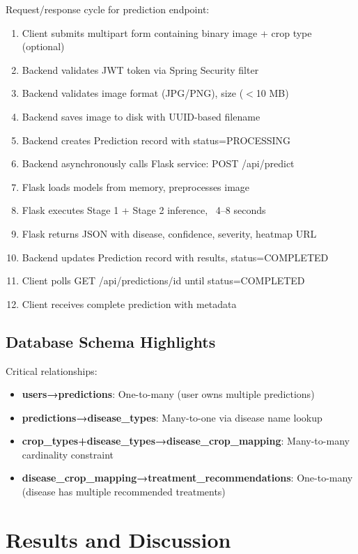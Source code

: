 \documentclass[conference]{IEEEtran}
\begin{document}
Request/response cycle for prediction endpoint:

\begin{enumerate}
\item Client submits multipart form containing binary image + crop type (optional)
\item Backend validates JWT token via Spring Security filter
\item Backend validates image format (JPG/PNG), size ($<$10 MB)
\item Backend saves image to disk with UUID-based filename
\item Backend creates Prediction record with status=PROCESSING
\item Backend asynchronously calls Flask service: POST /api/predict
\item Flask loads models from memory, preprocesses image
\item Flask executes Stage 1 + Stage 2 inference, ~4--8 seconds
\item Flask returns JSON with disease, confidence, severity, heatmap URL
\item Backend updates Prediction record with results, status=COMPLETED
\item Client polls GET /api/predictions/{id} until status=COMPLETED
\item Client receives complete prediction with metadata
\end{enumerate}

\subsection{Database Schema Highlights}

Critical relationships:

\begin{itemize}
\item \textbf{users→predictions}: One-to-many (user owns multiple predictions)
\item \textbf{predictions→disease\_types}: Many-to-one via disease name lookup
\item \textbf{crop\_types+disease\_types→disease\_crop\_mapping}: Many-to-many cardinality constraint
\item \textbf{disease\_crop\_mapping→treatment\_recommendations}: One-to-many (disease has multiple recommended treatments)
\end{itemize}

\section{Results and Discussion}
\label{sec:results}
\end{document}
